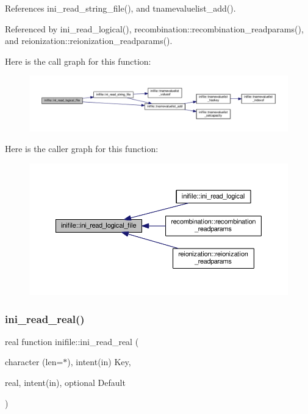 References ini\+\_\+read\+\_\+string\+\_\+file(), and tnamevaluelist\+\_\+add().



Referenced by ini\+\_\+read\+\_\+logical(), recombination\+::recombination\+\_\+readparams(), and reionization\+::reionization\+\_\+readparams().

Here is the call graph for this function\+:
\nopagebreak
\begin{figure}[H]
\begin{center}
\leavevmode
\includegraphics[width=350pt]{namespaceinifile_aa28324391b14e57e0c2a11866bda19f6_cgraph}
\end{center}
\end{figure}
Here is the caller graph for this function\+:
\nopagebreak
\begin{figure}[H]
\begin{center}
\leavevmode
\includegraphics[width=350pt]{namespaceinifile_aa28324391b14e57e0c2a11866bda19f6_icgraph}
\end{center}
\end{figure}
\mbox{\label{namespaceinifile_aa8c7c6b2bd003b849faacce75951fd64}} 
\subsubsection{\texorpdfstring{ini\+\_\+read\+\_\+real()}{ini\_read\_real()}}
{\footnotesize\ttfamily real function inifile\+::ini\+\_\+read\+\_\+real (\begin{DoxyParamCaption}\item[{character (len=$\ast$), intent(in)}]{Key,  }\item[{real, intent(in), optional}]{Default }\end{DoxyParamCaption})}



